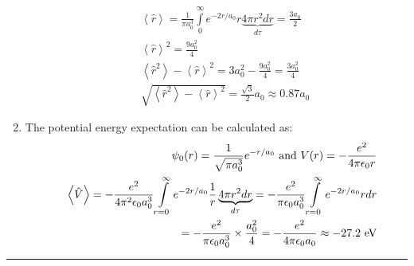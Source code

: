 \begin{enumerate}
\begin{eqnarray}
\nonumber
& & \left<\hat{r}\right> = \frac{1}{\pi a_0^3}\int\limits_{0}^{\infty}e^{-2r/a_0}r\underbrace{4\pi r^2 dr}_{d\tau} = \frac{3a_0}{2}\\
\nonumber
& & \left<\hat{r}\right>^2 = \frac{9a_0^2}{4}\\
\nonumber
& & \left<\hat{r}^2\right> - \left<\hat{r}\right>^2 = 3a_0^2 - \frac{9a_0^2}{4} = \frac{3a_0^2}{4}\\
\nonumber
& & \sqrt{\left<\hat{r}^2\right> - \left<\hat{r}\right>^2} = \frac{\sqrt{3}}{2}a_0\approx 0.87a_0
\end{eqnarray}
\item The potential energy expectation can be calculated as:
\begin{eqnarray}
\nonumber
& & \psi_0(r) = \frac{1}{\sqrt{\pi a_0^3}}e^{-r/a_0}\textnormal{ and }V(r) = -\frac{e^2}{4\pi\epsilon_0r}\\
\nonumber
& & \left<\hat{V}\right> = -\frac{e^2}{4\pi^2\epsilon_0a_0^3}\int\limits_{r=0}^{\infty}e^{-2r/a_0}\frac{1}{r}\underbrace{4\pi r^2dr}_{d\tau} = -\frac{e^2}{\pi\epsilon_0a_0^3}\int\limits_{r=0}^{\infty}e^{-2r/a_0}rdr\\
\nonumber
& & = -\frac{e^2}{\pi\epsilon_0a_0^3}\times\frac{a_0^2}{4} = -\frac{e^2}{4\pi\epsilon_0a_0}\approx -27.2\textnormal{ eV}
\end{eqnarray}
\end{enumerate}

\hrule\vspace{0.5cm}
